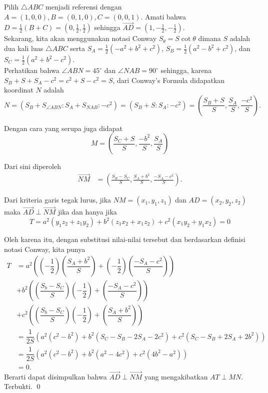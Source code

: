 \documentclass[a4paper, 12pt]{scrartcl}
\begin{document}
Pilih $\triangle ABC$ menjadi referensi dengan $A=(1,0,0), B=(0,1,0), C=(0,0,1)$. Amati bahwa $D=\frac{1}{2}(B+C) = (0,\frac{1}{2},\frac{1}{2})$ sehingga $\overrightarrow{AD} = (1,-\frac{1}{2},-\frac{1}{2})$.\\

Sekarang, kita akan menggunakan notasi Conway $S_\theta = S \cot \theta$ dimana $S$ adalah dua kali luas $\triangle ABC$ serta $S_A = \frac{1}{2}(-a^2+b^2+c^2)$, $S_B= \frac{1}{2}(a^2-b^2+c^2)$, dan $S_C = \frac{1}{2}(a^2+b^2-c^2)$.\\

Perhatikan bahwa $\angle ABN = 45^\circ$ dan $\angle NAB = 90^\circ$ sehingga,  karena $S_B+S+S_A-c^2 = c^2 + S -c^2 = S$, dari Conway's Formula didapatkan koordinat $N$ adalah
$$N = (S_B+S_{\angle ABN} : S_A+S_{NAB} : -c^2) = (S_B+S : S_A : -c^2) = \left(\frac{S_B+S}{S}, \frac{S_A}{S}, \frac{-c^2}{S}\right).$$


Dengan cara yang serupa juga didapat
$$M = \left(\frac{S_C+S}{S}, \frac{-b^2}{S}, \frac{S_A}{S}\right)$$

Dari sini diperoleh
\begin{equation*}
\begin{split}
\overrightarrow{NM} &= \left(\frac{S_B-S_C}{S}, \frac{S_A+b^2}{S}, \frac{-S_A-c^2}{S}\right).
\end{split}
\end{equation*}

Dari kriteria garis tegak lurus, jika $NM = (x_1,y_1,z_1)$ dan $AD = (x_2,y_2,z_2)$ maka  $\overrightarrow{AD} \perp \overrightarrow{NM}$ jika dan hanya jika
$$T = a^2(y_1z_2+z_1y_2)+b^2(z_1x_2+x_1z_2)+c^2(x_1y_2+y_1x_2) = 0$$

Oleh karena itu, dengan substitusi nilai-nilai tersebut dan berdasarkan definisi notasi Conway, kita punya
\begin{equation*}
\begin{split}
T &= a^2\left(\left(-\dfrac{1}{2}\right)\left(\dfrac{S_A+b^2}{S}\right)+\left(-\dfrac{1}{2}\right)\left(\dfrac{-S_A-c^2}{S}\right)\right)\\
&+b^2\left(\left(\dfrac{S_b-S_C}{S}\right)\left(-\dfrac{1}{2}\right)+\left(\dfrac{-S_A-c^2}{S}\right)\right)\\
&+c^2\left(\left(\dfrac{S_b-S_C}{S}\right)\left(-\dfrac{1}{2}\right)+\left(\dfrac{S_A+b^2}{S}\right)\right)\\
&=\dfrac{1}{2S}\left(a^2(c^2-b^2)+b^2(S_C-S_B-2S_A-2c^2)+c^2(S_C-S_B+2S_A+2b^2)\right)\\
&=\dfrac{1}{2S}\left(a^2(c^2-b^2)+b^2(a^2-4c^2)+c^2(4b^2-a^2)\right)\\
&= 0.
\end{split}
\end{equation*}
Berarti dapat disimpulkan bahwa $\overrightarrow{AD} \perp \overrightarrow{NM}$ yang mengakibatkan $AT \perp MN$. Terbukti. \qed
\end{document}
